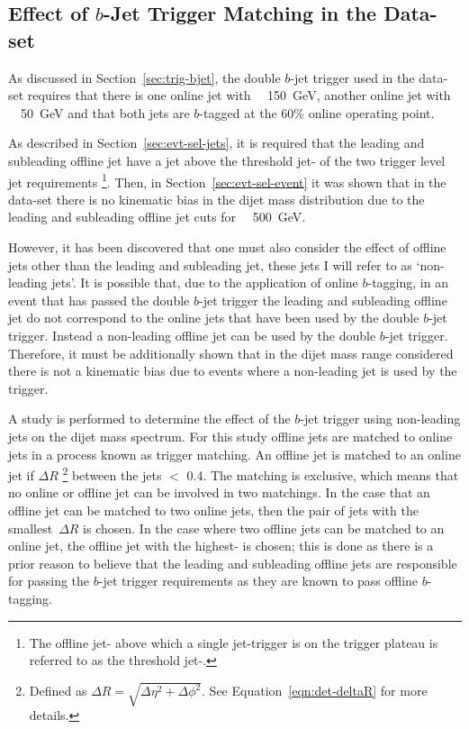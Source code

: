 \newpage
\subsection{Effect of $b$-Jet Trigger Matching in the \lm{} Data-set}
\label{sec:evt-sel_btrigMatch}

As discussed in Section~\ref{sec:trig-bjet},
the double $b$-jet trigger used in the \lm{} data-set
requires that there is one online jet with \pT{}~\gt~150~GeV,
another online jet with \pT{}~\gt~50~GeV
and that both jets are $b$-tagged at the 60\% online operating point.

As described in Section~\ref{sec:evt-sel-jets}, it is required that the leading and subleading offline jet have a jet \pT{} above
the threshold jet-\pT{} of the two trigger level jet requirements
\footnote{The offline jet-\pT{} above which a single jet-trigger is on the trigger plateau is referred to as the threshold jet-\pT.}.
Then, in Section~\ref{sec:evt-sel-event} it was shown that in the \lm{} data-set
there is no kinematic bias in the dijet mass distribution due to the leading and subleading offline jet \pT{} cuts for \mjj{}~\gt{}~500~GeV.

However, it has been discovered that one must also consider the effect of offline jets other than the leading and subleading jet,
these jets I will refer to as `non-leading jets'.
It is possible that, due to the application of online $b$-tagging,
in an event that has passed the double $b$-jet trigger the
leading and subleading offline jet do not correspond to the
online jets that have been used by the double $b$-jet trigger.
Instead a non-leading offline jet can be used by the double $b$-jet trigger.
Therefore, it must be additionally shown that in the dijet mass range considered there is not a kinematic bias
due to events where a non-leading jet is used by the trigger.

A study is performed to determine the effect of the $b$-jet trigger using non-leading jets on the dijet mass spectrum.
For this study offline jets are matched to online jets in a process known as trigger matching.
An offline jet is matched to an online jet if $\Delta R$
\footnote{Defined as $\Delta R = \sqrt{\Delta\eta^{2} + \Delta\phi^{2}}$. See Equation~\ref{eqn:det-deltaR} for more details.}
between the jets $<$ 0.4.
The matching is exclusive, which means that no online or offline jet can be involved in two matchings.
In the case that an offline jet can be matched to two online jets, then the pair of jets with the smallest~$\Delta R$ is chosen.
In the case where two offline jets can be matched to an online jet, the offline jet with the highest-\pT{} is chosen;
this is done as there is a prior reason to believe that the leading and subleading offline jets are responsible
for passing the $b$-jet trigger requirements as they are known to pass offline $b$-tagging.

